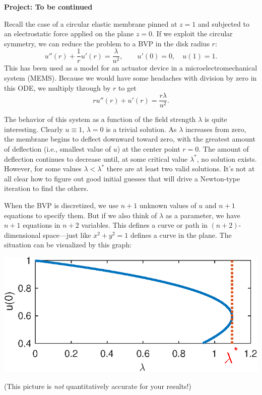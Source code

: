 \documentclass[11pt,letterpaper]{article}
\begin{document}
	
\begin{center}
  \bf 
  Project: To be continued
\end{center}
	

Recall the case of a circular elastic membrane pinned at $z=1$ and subjected to an electrostatic force applied on the plane $z=0$. If we exploit the circular symmetry, we can reduce the problem to a BVP in the disk radius $r$:
\begin{equation}
  \label{eq:mems}
  u''(r) + \frac{1}{r} u'(r) = \frac{\lambda}{u^2},  \qquad u'(0)=0, \quad u(1)=1.
\end{equation}
This has been used as a model for an actuator device in a microelectromechanical system (MEMS). Because we would have some headaches with division by zero in this ODE, we multiply through by $r$ to get
\begin{equation}
  \label{eq:rmems}
  r u''(r) + u'(r) = \frac{r\lambda}{u^2}.
\end{equation}

The behavior of this system as a function of the field strength $\lambda$ is quite interesting. Clearly $u\equiv 1$, $\lambda=0$ is a trivial solution. As $\lambda$ increases from zero, the membrane begins to deflect downward toward zero, with the greatest amount of deflection (i.e., smallest value of $u$) at the center point $r=0$. The amount of deflection continues to decrease until, at some critical value $\lambda^*$, no solution exists. However, for some values $\lambda < \lambda^*$ there are at least two valid solutions. It's not at all clear how to figure out good initial guesses that will drive a Newton-type iteration to find the others. 

When the BVP is discretized, we use $n+1$ unknown values of $u$ and $n+1$ equations to specify them. But if we also think of $\lambda$ as a parameter, we have $n+1$ equations in $n+2$ variables. This defines a curve or path in $(n+2)$-dimensional space---just like $x^2+y^2=1$ defines a curve in the plane. The situation can be visualized by this graph:
\begin{center}
  \includegraphics{strip_path}
\end{center}
(This picture is \emph{not} quantitatively accurate for your results!) 
\end{document}
